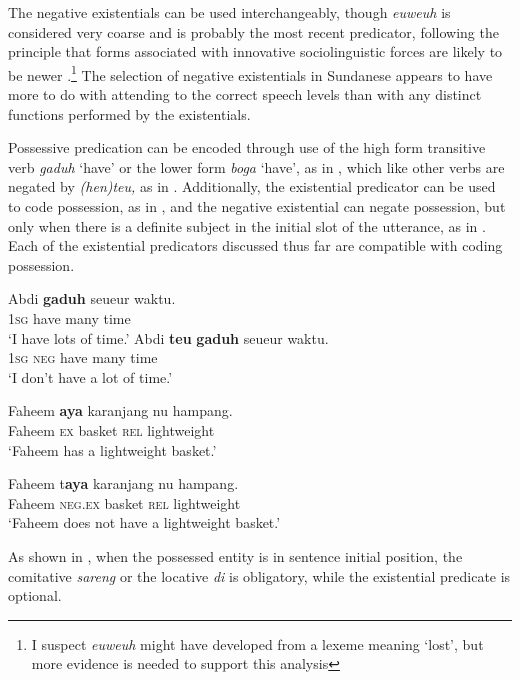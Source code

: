 \documentclass[output=paper]{langscibook}
\begin{document}
The negative existentials can be used interchangeably, though \textit{euweuh} is considered very coarse and is probably the most recent predicator, following the principle that forms associated with innovative sociolinguistic forces are likely to be newer \citep{Greenberg1966synchronic}.\footnote{I suspect \textit{euweuh} might have developed from a lexeme meaning ‘lost’, but more evidence is needed to support this analysis} The selection of negative existentials in Sundanese appears to have more to do with attending to the correct speech levels than with any distinct functions performed by the existentials. 

Possessive predication can be encoded through use of the high form transitive verb \textit{gaduh} ‘have’ or the lower form \textit{boga} ‘have’, as in , which like other verbs are negated by \textit{(hen)teu,} as in . Additionally, the existential predicator can be used to code possession, as in , and the negative existential can negate possession, but only when there is a definite subject in the initial slot of the utterance, as in . Each of the existential predicators discussed thus far are compatible with coding possession. 

  \ea\label{ex:sun:25}
    \ea\label{ex:sun:25a}
        \gll  Abdi \textbf{gaduh} seueur waktu. \\ 
              1\textsc{sg} have many time \\
        \glt ‘I have lots of time.’
    \ex\label{ex:sun:25b}
        \gll  Abdi \textbf{teu} \textbf{gaduh} seueur waktu. \\
              1\textsc{sg} \textsc{neg} have many time \\
        \glt ‘I don’t have a lot of time.’

    \ex\label{ex:sun:25c}
        \gll  Faheem \textbf{aya} karanjang nu hampang.\\
              Faheem \textsc{ex} basket \textsc{rel} lightweight\\
        \glt ‘Faheem has a lightweight basket.’

    \ex\label{ex:sun:25d}
        \gll Faheem t\textbf{aya} karanjang nu hampang.\\
              Faheem \textsc{neg}.\textsc{ex} basket \textsc{rel} lightweight\\
        \glt ‘Faheem does not have a lightweight basket.’
    \z 
\z

As shown in , when the possessed entity is in sentence initial position, the comitative \textit{sareng} or the locative \textit{di} is obligatory, while the existential predicate is optional. 
\end{document}
